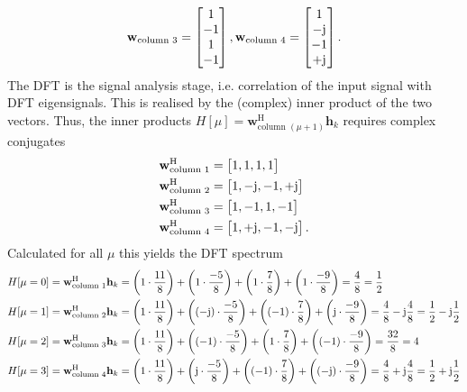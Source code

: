 \documentclass[11pt,a4paper,DIV=12]{scrartcl}
\begin{document}
\begin{Loesung}
\begin{enumerate}[label=\alph*)]
\begin{align}
  \mathbf{w}_\text{column 3} = \begin{bmatrix}1\\-1\\1\\-1\end{bmatrix},
  \mathbf{w}_\text{column 4} = \begin{bmatrix}1\\-\im\\-1\\+\im\end{bmatrix}.
  \end{align}
  The DFT is the signal analysis stage, i.e. correlation of the input signal with
  DFT eigensignals. This is realised by the (complex) inner product of the two vectors.
  Thus, the inner products $H[\mu] = \mathbf{w}_{\text{column } (\mu+1)}^\text{H} \mathbf{h}_k$
  requires complex conjugates
  \begin{align}
  &\mathbf{w}_\text{column 1}^\text{H} = \begin{bmatrix}1, 1, 1, 1\end{bmatrix}\nonumber\\
  &\mathbf{w}_\text{column 2}^\text{H} = \begin{bmatrix}1,-\im,-1,+\im\end{bmatrix}\nonumber\\
  &\mathbf{w}_\text{column 3}^\text{H} = \begin{bmatrix}1,-1,1,-1\end{bmatrix}\nonumber\\
  &\mathbf{w}_\text{column 4}^\text{H} = \begin{bmatrix}1,+\im,-1,-\im\end{bmatrix}.
  \end{align}
  Calculated for all $\mu$ this yields the DFT spectrum
  \begin{align}
  H[\mu=0]&=\mathbf{w}_{\text{column 1}}^\text{H} \mathbf{h}_k = \left(1\cdot\frac{11}{8}\right)+\left(1\cdot\frac{-5}{8}\right)+\left(1\cdot\frac{7}{8}\right)+\left(1\cdot\frac{-9}{8}\right)=\frac{4}{8}=\frac{1}{2}\nonumber\\
  H[\mu=1]&=\mathbf{w}_{\text{column 2}}^\text{H} \mathbf{h}_k = \left(1\cdot\frac{11}{8}\right)+\left((-\im)\cdot\frac{-5}{8}\right)+\left((-1)\cdot\frac{7}{8}\right)+\left(\im\cdot\frac{-9}{8}\right)=\frac{4}{8}-\im\frac{4}{8}=\frac{1}{2}-\im\frac{1}{2}\nonumber\\
  H[\mu=2]&=\mathbf{w}_{\text{column 3}}^\text{H} \mathbf{h}_k= \left(1\cdot\frac{11}{8}\right)+\left((-1)\cdot\frac{-5}{8}\right)+\left(1\cdot\frac{7}{8}\right)+\left((-1)\cdot\frac{-9}{8}\right)=\frac{32}{8}=4\nonumber\\
  H[\mu=3]&=\mathbf{w}_{\text{column 4}}^\text{H} \mathbf{h}_k= \left(1\cdot\frac{11}{8}\right)+\left(\im\cdot\frac{-5}{8}\right)+\left((-1)\cdot\frac{7}{8}\right)+\left((-\im)\cdot\frac{-9}{8}\right)=\frac{4}{8}+\im\frac{4}{8}=\frac{1}{2}+\im\frac{1}{2}\nonumber
  \end{align}


\end{enumerate}
\end{Loesung}
\end{document}
